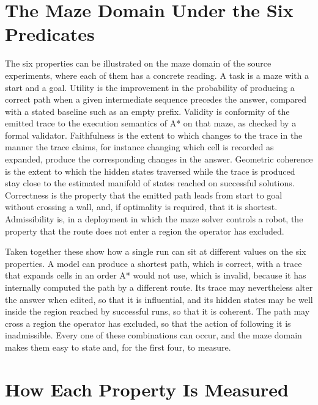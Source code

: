\section{The Maze Domain Under the Six Predicates}

The six properties can be illustrated on the maze domain of the source experiments, where each of them has a concrete reading. A task is a maze with a start and a goal. Utility is the improvement in the probability of producing a correct path when a given intermediate sequence precedes the answer, compared with a stated baseline such as an empty prefix. Validity is conformity of the emitted trace to the execution semantics of A* on that maze, as checked by a formal validator. Faithfulness is the extent to which changes to the trace in the manner the trace claims, for instance changing which cell is recorded as expanded, produce the corresponding changes in the answer. Geometric coherence is the extent to which the hidden states traversed while the trace is produced stay close to the estimated manifold of states reached on successful solutions. Correctness is the property that the emitted path leads from start to goal without crossing a wall, and, if optimality is required, that it is shortest. Admissibility is, in a deployment in which the maze solver controls a robot, the property that the route does not enter a region the operator has excluded.

Taken together these show how a single run can sit at different values on the six properties. A model can produce a shortest path, which is correct, with a trace that expands cells in an order A* would not use, which is invalid, because it has internally computed the path by a different route. Its trace may nevertheless alter the answer when edited, so that it is influential, and its hidden states may be well inside the region reached by successful runs, so that it is coherent. The path may cross a region the operator has excluded, so that the action of following it is inadmissible. Every one of these combinations can occur, and the maze domain makes them easy to state and, for the first four, to measure.

\section{How Each Property Is Measured}


